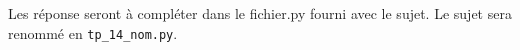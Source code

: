 Les réponse seront à compléter dans le fichier.py fourni avec le sujet. Le sujet sera renommé en \texttt{tp\_14\_nom.py}.
